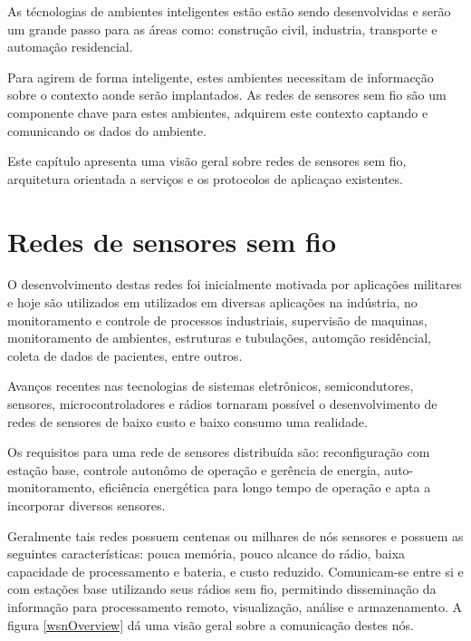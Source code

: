 As t\'ecnologias de ambientes inteligentes est\~ao est\~ao sendo desenvolvidas e ser\~ao um grande passo para as \'areas como: constru\c{c}\~ao civil, industria, transporte e automa\c{c}\~ao residencial.

Para agirem de forma inteligente, estes ambientes necessitam de informac\c{c}\~ao sobre o contexto aonde ser\~ao implantados. As redes de sensores sem fio s\~ao um componente chave para estes ambientes, adquirem este contexto captando e comunicando os dados do ambiente.\cite{lewis2004wireless}

Este cap\'itulo apresenta uma vis\~ao geral sobre redes de sensores sem fio, arquitetura orientada a servi\c{c}os e os protocolos de aplica\c{c}ao existentes.

\section{Redes de sensores sem fio}

O desenvolvimento destas redes foi inicialmente motivada por aplica\c{c}\~oes militares e hoje s\~ao utilizados em 
utilizados em diversas aplica\c{c}\~oes na ind\'ustria, no monitoramento e controle de processos industriais, supervis\~ao de maquinas, monitoramento de ambientes, estruturas e tubula\c{c}\~oes, autom\c{c}\~ao resid\^encial, coleta de dados de pacientes, entre outros.

Avan\c{c}os recentes nas tecnologias de sistemas eletr\^onicos, semicondutores, sensores, microcontroladores e r\'adios tornaram poss\'ivel o desenvolvimento de redes de sensores de baixo custo e baixo consumo uma realidade.

Os requisitos para uma rede de sensores distribu\'ida s\~ao: reconfigura\c{c}\~ao com esta\c{c}\~ao base, controle auton\^omo de opera\c{c}\~ao e ger\^encia de energia, auto-monitoramento, efici\^encia energ\'etica para longo tempo de opera\c{c}\~ao e apta a incorporar diversos sensores.\cite{542724}


Geralmente tais redes possuem centenas ou milhares de n\'os sensores e possuem as seguintes caracter\'isticas: pouca mem\'oria, pouco alcance do r\'adio, baixa capacidade de processamento e bateria, e custo reduzido. Comunicam-se entre si e com esta\c{c}\~oes base utilizando seus r\'adios sem fio, permitindo dissemina\c{c}\~ao da informa\c{c}\~ao para processamento remoto, visualiza\c{c}\~ao, an\'alise e armazenamento. A figura \ref{wsnOverview} d\'a uma vis\~ao geral sobre a comunica\c{c}\~ao destes n\'os.

